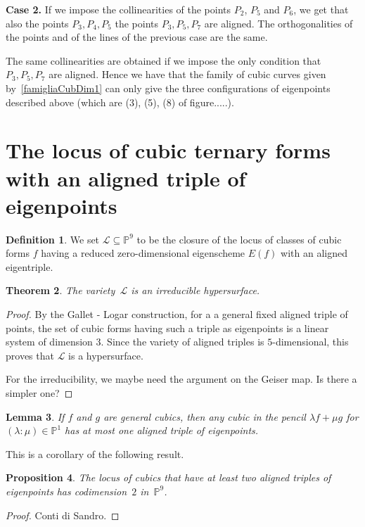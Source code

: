 \documentclass[12pt, a4paper, reqno, captions=tableheading,bibliography=totoc]{scrartcl}
\theoremstyle{plain}
\newtheorem{lemma}{Lemma}[section]
\newtheorem{prop}[lemma]{Proposition}
\newtheorem{theorem}[lemma]{Theorem}
\theoremstyle{definition}
\newtheorem{definition}[lemma]{Definition}
\newcommand{\p}{\mathbb{P}}
\begin{document}
  \textbf{Case 2.} If we impose the collinearities of the points
  $P_2$, $P_5$ and $P_6$, we get that also the points $P_3, P_4, P_5$
  the points $P_3, P_5, P_7$ are aligned. The orthogonalities of the
  points and of the lines of the previous case are the same.

  The same collinearities are obtained if we impose the only condition
  that $P_3, P_5, P_7$ are aligned. Hence we have that the family of
  cubic curves given by~\ref{famigliaCubDim1} can only give the
  three configurations of eigenpoints described above (which are
  (3), (5), (8) of figure.....).

\section{The locus of cubic ternary forms with an aligned triple of eigenpoints}

\begin{definition}
 We set $\mathcal{L} \subseteq \p^9$ to be the closure of the locus of classes of cubic forms $f$ having a reduced zero-dimensional eigenscheme $E(f)$ with an aligned eigentriple.
\end{definition}

\begin{theorem}
The variety~$\mathcal{L}$ is an irreducible hypersurface.
\end{theorem}

\begin{proof}
By the Gallet - Logar construction, for a a general fixed aligned triple of points, the set of cubic forms having such a triple as eigenpoints is a linear system of dimension 3. Since the variety of aligned triples is $5$-dimensional, this proves that $\mathcal{L}$ is a hypersurface.

For the irreducibility, we maybe need the argument on the Geiser map. Is there a simpler one?
\end{proof}

\begin{lemma}
\label{lemma:pencil_one_aligned}
 If $f$ and $g$ are general cubics, then any cubic in the pencil $\lambda f + \mu g$ for $(\lambda: \mu) \in \p^1$ has at most one aligned triple of eigenpoints.
\end{lemma}

This is a corollary of the following result.

\begin{prop}
    The locus of cubics that have at least two aligned triples of eigenpoints has codimension~$2$ in~$\p^9$.
\end{prop}
\begin{proof}
    Conti di Sandro.
\end{proof}
\end{document}
